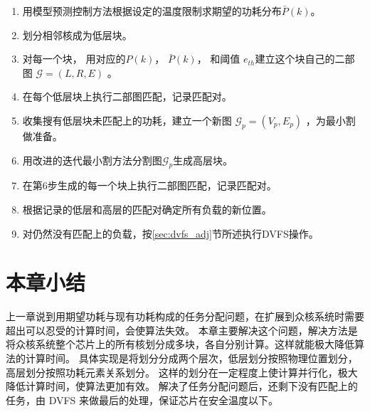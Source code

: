 \begin{enumerate}
\item 用模型预测控制方法根据设定的温度限制求期望的功耗分布$\bar{P}(k)$。
\item 划分相邻核成为低层块。
\item 对每一个块， 用对应的$P(k)$， $\bar{P}(k)$，  和阈值 $e_{th}$建立这个块自己的二部图 $\mathcal{G} = (L, R, E)$ 。
\item 在每个低层块上执行二部图匹配，记录匹配对。
\item 收集搜有低层块未匹配上的功耗，建立一个新图 $\mathcal{G}_p = (V_p, E_p)$ ，为最小割做准备。
\item 用改进的迭代最小割方法分割图$\mathcal{G}_p$生成高层块。 
\item 在第6步生成的每一个块上执行二部图匹配，记录匹配对。
\item 根据记录的低层和高层的匹配对确定所有负载的新位置。
\item 对仍然没有匹配上的负载，按\ref{sec:dvfs_adj}节所述执行DVFS操作。
\end{enumerate}
\section{本章小结}\label{sec:xiaojie5}
上一章说到用期望功耗与现有功耗构成的任务分配问题，在扩展到众核系统时需要超出可以忍受的计算时间，会使算法失效。
本章主要解决这个问题，解决方法是将众核系统整个芯片上的所有核划分成多块，各自分别计算。这样就能极大降低算法的计算时间。
具体实现是将划分分成两个层次，低层划分按照物理位置划分，高层划分按照功耗元素关系划分。
这样的划分在一定程度上使计算并行化，极大降低计算时间，使算法更加有效。
解决了任务分配问题后，还剩下没有匹配上的任务，由 DVFS 来做最后的处理，保证芯片在安全温度以下。














































